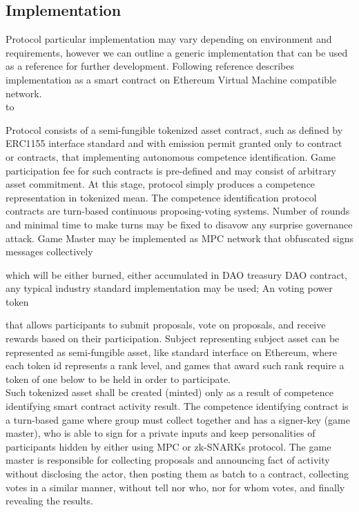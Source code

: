 \documentclass{article}
\begin{document}
\begin{CJK}{UTF8}{gbsn}
\begin{multicols}{2}
        \section{Implementation}
        Protocol particular implementation may vary depending on environment and requirements, however we can outline a generic implementation that can be used as a reference for further development. Following reference describes implementation as a smart contract on Ethereum Virtual Machine compatible network. \\

        to

        \end{multicols}
        
        \begin{multicols}{2}



        Protocol consists of a semi-fungible tokenized asset contract, such as defined by ERC1155\cite{EIP1155} interface standard and with emission permit granted only to contract or contracts, that implementing autonomous competence identification. Game participation fee for such contracts is pre-defined and may consist of arbitrary asset commitment.
        At this stage, protocol simply produces a competence representation in tokenized mean. The competence identification protocol contracts are turn-based continuous proposing-voting systems. Number of rounds and minimal time to make turns may be fixed to disavow any surprise governance attack. Game Master may be implemented as MPC network that obfuscated signs messages collectively

        which will be either burned, either accumulated in DAO treasury      DAO contract, any typical industry standard implementation may be used; An voting power token


        that allows participants to submit proposals, vote on proposals, and receive rewards based on their participation. Subject representing subject asset can be represented as semi-fungible asset, like standard interface on Ethereum, where each token id represents a rank level, and games that award such rank require a token of one below to be held in order to participate. \\ Such tokenized asset shall be created (minted) only as a result of competence identifying smart contract activity result. The competence identifying contract is a turn-based game where group must collect together and has a signer-key (game master), who is able to sign for a private inputs and keep personalities of participants hidden by either using MPC or zk-SNARKs protocol.
        The game master is responsible for collecting proposals and announcing fact of activity without disclosing the actor, then posting them as batch to a contract, collecting votes in a similar manner, without tell nor who, nor for whom votes, and finally revealing the results.\\




\end{multicols}
\end{CJK}
\end{document}
